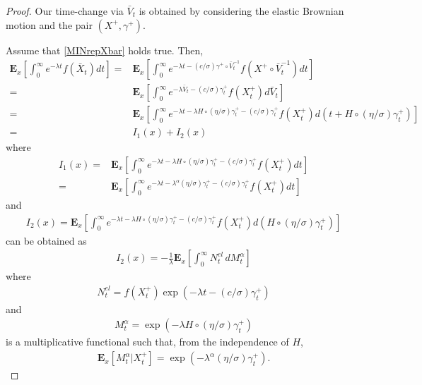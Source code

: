 \documentclass[11pt,a4paper]{article}
\begin{document}
\begin{proof}
Our time-change via $\bar{V}_t$ is obtained by considering the elastic Brownian motion and the pair $(X^+, \gamma^+)$.

Assume that \eqref{MINrepXbar} holds true. Then,
\begin{align*}
\mathbf{E}_x\left[ \int_0^\infty e^{-\lambda t} f(\bar{X}_t) dt \right]
= & \mathbf{E}_x\left[ \int_0^\infty e^{-\lambda t - (c/\sigma) \gamma^+ \circ \bar{V}^{-1}_t } f(X^+ \circ \bar{V}^{-1}_t) dt \right]\\
= & \mathbf{E}_x\left[ \int_0^\infty e^{- \lambda \bar{V}_t - (c/\sigma) \gamma^+_t } f(X^+_t) d\bar{V}_t \right]\\
= & \mathbf{E}_x\left[ \int_0^\infty e^{- \lambda t - \lambda H \circ (\eta/\sigma) \gamma^+_t - (c/\sigma) \gamma^+_t } f(X^+_t) d(t + H \circ (\eta/\sigma) \gamma^+_t) \right]\\
= & I_1(x) + I_2(x)
\end{align*}
where
\begin{align*}
I_1(x) 
= & \mathbf{E}_x\left[ \int_0^\infty e^{- \lambda t - \lambda H \circ (\eta/\sigma) \gamma^+_t - (c/\sigma) \gamma^+_t } f(X^+_t) dt \right] \\
= & \mathbf{E}_x\left[ \int_0^\infty e^{- \lambda t - \lambda^\alpha (\eta/\sigma) \gamma^+_t - (c/\sigma) \gamma^+_t } f(X^+_t) dt \right]
\end{align*}
and
\begin{align*}
I_2(x) = \mathbf{E}_x\left[ \int_0^\infty e^{- \lambda t - \lambda H \circ (\eta/\sigma) \gamma^+_t - (c/\sigma) \gamma^+_t } f(X^+_t) d(H \circ (\eta/\sigma) \gamma^+_t) \right]
\end{align*}
can be obtained as
\begin{align*}
I_2 (x) = - \frac{1}{\lambda} \mathbf{E}_x\left[ \int_0^\infty N^{el}_t\, d M^\alpha_t \right] 
\end{align*}
where
\begin{align*}
N^{el}_t = f(X^+_t) \exp \left(-\lambda t - (c/\sigma) \gamma^+_t\right)
\end{align*}
and  
\begin{align*}
M^\alpha_t = \exp(-\lambda H \circ (\eta/\sigma) \gamma^+_t)
\end{align*}
is a multiplicative functional such that, from the independence of $H$,
\begin{align*}
\mathbf{E}_x[M^\alpha_t | X^+_t] = \exp(-\lambda^\alpha (\eta/\sigma) \gamma^+_t).
\end{align*}

\end{proof}
\end{document}
